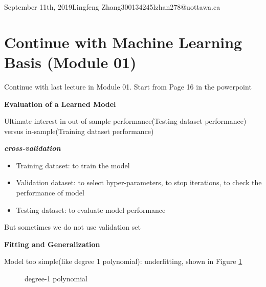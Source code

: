 \documentclass{article}
\begin{document}
\begin{lecture}{September 11th, 2019}{Lingfeng Zhang}{300134245}{lzhan278@uottawa.ca}

\section{Continue with Machine Learning Basis (Module 01)}

Continue with last lecture in Module 01. Start from Page 16 in the powerpoint

\textbf{Evaluation of a Learned Model}

Ultimate interest in out-of-sample performance(Testing dataset performance) versus in-sample(Training dataset performance)

\textbf{\textit{cross-validation}}

\begin{itemize}
\item Training dataset: to train the model

\item Validation dataset: to select hyper-parameters, to stop iterations, to check the performance of model

\item Testing dataset: to evaluate model performance
\end{itemize}

But sometimes we do not use validation set

\textbf{Fitting and Generalization}

Model too simple(like degree 1 polynomial): underfitting, shown in Figure \ref{fig:degree1polynomial}

\begin{figure}[ht!]
\centering
{}
\caption{degree-1 polynomial}
\label{fig:degree1polynomial}
\end{figure}



\end{lecture}
\end{document}
